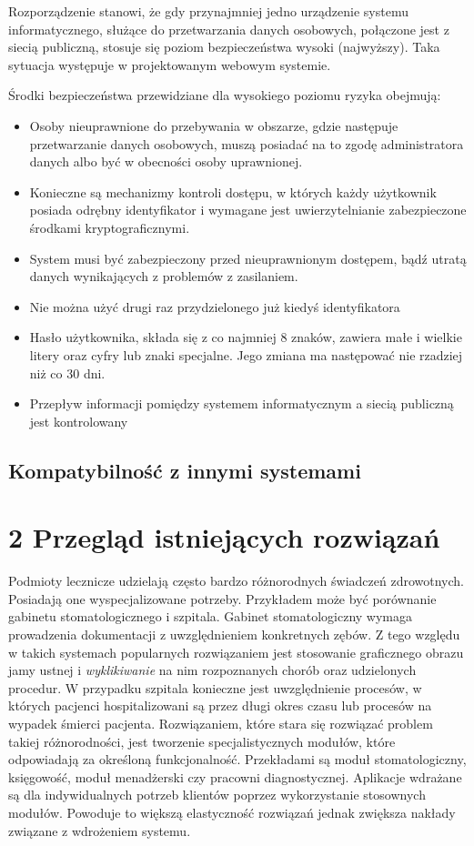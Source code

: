 Rozporządzenie stanowi, że gdy przynajmniej jedno urządzenie systemu informatycznego, służące do przetwarzania danych osobowych, połączone jest z siecią publiczną, stosuje się poziom bezpieczeństwa wysoki (najwyższy). Taka sytuacja występuje w projektowanym webowym systemie. 

Środki bezpieczeństwa przewidziane dla wysokiego poziomu ryzyka obejmują:
\begin{itemize}
\item Osoby nieuprawnione do przebywania w obszarze, gdzie następuje przetwarzanie danych osobowych, muszą posiadać na to zgodę administratora danych albo być w obecności osoby uprawnionej.
\item Konieczne są mechanizmy kontroli dostępu, w których każdy użytkownik posiada odrębny identyfikator i wymagane jest uwierzytelnianie zabezpieczone środkami kryptograficznymi.
\item System musi być zabezpieczony przed nieuprawnionym dostępem, bądź utratą danych wynikających z problemów z zasilaniem.
\item Nie można użyć drugi raz przydzielonego już kiedyś identyfikatora
\item Hasło użytkownika, składa się z co najmniej 8 znaków, zawiera małe i wielkie litery oraz cyfry lub znaki specjalne. Jego zmiana ma następować nie rzadziej niż co 30 dni.
\item Przepływ informacji pomiędzy systemem informatycznym a siecią publiczną jest kontrolowany
\end{itemize}


\subsection{Kompatybilność z innymi systemami}
\section[Przegląd istniejących rozwiązań][Przegląd istniejących rozwiązań]{2 Przegląd istniejących rozwiązań}
Podmioty lecznicze udzielają często bardzo różnorodnych świadczeń zdrowotnych. Posiadają one wyspecjalizowane potrzeby. Przykładem może być porównanie gabinetu stomatologicznego i szpitala. Gabinet stomatologiczny wymaga prowadzenia dokumentacji z uwzględnieniem konkretnych zębów. Z tego względu w takich systemach popularnych rozwiązaniem jest stosowanie graficznego obrazu jamy ustnej i \emph{wyklikiwanie} na nim rozpoznanych chorób oraz udzielonych procedur. W przypadku szpitala konieczne jest uwzględnienie procesów, w których pacjenci hospitalizowani są przez długi okres czasu lub procesów na wypadek śmierci pacjenta. Rozwiązaniem, które stara się rozwiązać problem takiej różnorodności, jest tworzenie specjalistycznych modułów, które odpowiadają za określoną funkcjonalność. Przekładami są moduł stomatologiczny, księgowość, moduł menadżerski czy pracowni diagnostycznej. Aplikacje wdrażane są dla indywidualnych potrzeb klientów poprzez wykorzystanie stosownych modułów. Powoduje to większą elastyczność rozwiązań jednak zwiększa nakłady związane z wdrożeniem systemu. 

